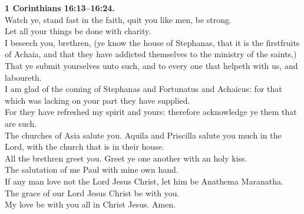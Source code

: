 \documentclass[10pt]{article} %
\begin{document}
{\begin{minipage}[t]{0.45\textwidth}
\textbf{1 Corinthians 16:13--16:24.}\\
Watch ye, stand fast in the faith, quit you like men, be strong.\\
Let all your things be done with charity.\\
I beseech you, brethren, (ye know the house of Stephanas, that it is the firstfruits of Achaia, and that they have addicted themselves to the ministry of the saints,)\\
That ye submit yourselves unto such, and to every one that helpeth with us, and laboureth.\\
I am glad of the coming of Stephanas and Fortunatus and Achaicus: for that which was lacking on your part they have supplied.\\
For they have refreshed my spirit and yours: therefore acknowledge ye them that are such.\\
The churches of Asia salute you. Aquila and Priscilla salute you much in the Lord, with the church that is in their house.\\
All the brethren greet you. Greet ye one another with an holy kiss.\\
The salutation of me Paul with mine own hand.\\
If any man love not the Lord Jesus Christ, let him be Anathema Maranatha.\\
The grace of our Lord Jesus Christ be with you.\\
My love be with you all in Christ Jesus. Amen. 
\end{minipage}}
\vspace*{\fill}
\newpage
\Huge%
\vspace*{\fill}
\begin{spacing}{1.2}%
\end{spacing}
\vspace*{\fill}
\end{document}
